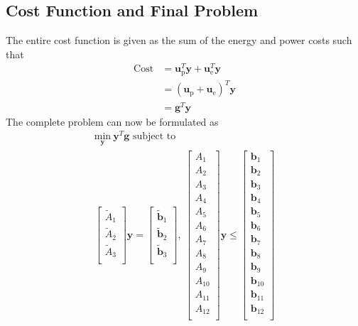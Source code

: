 \subsection{Cost Function and Final Problem}
The entire cost function is given as the sum of the energy and power costs such that
\begin{equation}\begin{aligned}
	\text{Cost} &= \mathbf{u}_{\text{p}}^T\mathbf{y} + \mathbf{u}_{\text{e}}^T\mathbf{y} \\
	            &= \left( \mathbf{u}_{\text{p}} + \mathbf{u}_{\text{e}} \right )^T\mathbf{y} \\
		    &= \mathbf{g}^T\mathbf{y}
\end{aligned}\end{equation}
The complete problem can now be formulated as
\begin{equation}\begin{matrix}
	\underset{\mathbf{y}}{\text{min}} \ \mathbf{y}^T\mathbf{g} \text{ subject to } \\
	\begin{bmatrix}
		\tilde{A}_{1} \\ 
		\tilde{A}_{2} \\
		\tilde{A}_{3} \\
	\end{bmatrix}\mathbf{y} = 
	\begin{bmatrix}
		\tilde{\mathbf{b}}_{1} \\
		\tilde{\mathbf{b}}_{2} \\
		\tilde{\mathbf{b}}_{3} \\
	\end{bmatrix}, \ 
	\begin{bmatrix}
		A_{1} \\
		A_{2} \\
		A_{3} \\
		A_{4} \\
		A_{5} \\
		A_{6} \\
		A_{7} \\
		A_{8} \\
		A_{9} \\
		A_{10}\\
		A_{11}\\
		A_{12}\\
	 \end{bmatrix}\mathbf{y} \le 
	 \begin{bmatrix}
		\mathbf{b}_{1} \\
		\mathbf{b}_{2} \\
		\mathbf{b}_{3} \\
		\mathbf{b}_{4} \\
		\mathbf{b}_{5} \\
		\mathbf{b}_{6} \\
		\mathbf{b}_{7} \\
		\mathbf{b}_{8} \\
		\mathbf{b}_{9} \\
		\mathbf{b}_{10}\\
		\mathbf{b}_{11}\\
		\mathbf{b}_{12}\\
	 \end{bmatrix}
\end{matrix} \end{equation}
